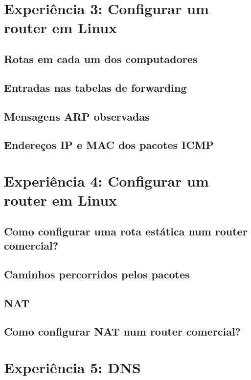 \documentclass[a4paper,11pt,titlepage]{article}
\begin{document}
\section{Experiência 3: Configurar um router em Linux }

\subsection{Rotas em cada um dos computadores}

\subsection{Entradas nas tabelas de forwarding}

\subsection{Mensagens ARP observadas}

\subsection{Endereços IP e MAC dos pacotes ICMP}

\section{Experiência 4: Configurar um router em Linux }

\subsection{Como configurar uma rota estática num router comercial?}

\subsection{Caminhos percorridos pelos pacotes}

\subsection{NAT}

\subsection{Como configurar NAT num router comercial?}

\section{Experiência 5: DNS }
\end{document}

